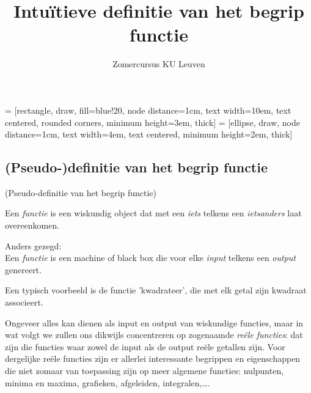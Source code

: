 \documentclass{ximera}
\author{Zomercursus KU Leuven}
\title{Intuïtieve definitie van het begrip functie}
\begin{document}
\begin{abstract}

\end{abstract}
\maketitle  

 = [rectangle, draw, fill=blue!20, node distance=1cm, text width=10em, text centered, rounded corners, minimum height=3em, thick]
 = [ellipse, draw, node distance=1cm, text width=4em, text centered, minimum height=2em, thick]

\subsection{(Pseudo-)definitie van het begrip functie}

\begin{definition} (Pseudo-definitie van het begrip functie)\label{fctie:def:pseudodef}
    
Een  \textit{functie} is een wiskundig object dat met een \textit{iets} telkens een \textit{ietsanders} laat overeenkomen. 


Anders gezegd: \\
Een \textit{functie} is een machine of black box die voor elke \textit{input} telkens een \textit{output} genereert.
\end{definition}

Een typisch voorbeeld is de functie 'kwadrateer', die met elk getal zijn kwadraat associeert.


Ongeveer alles kan dienen als input en output van wiskundige functies, maar in wat volgt we zullen ons dikwijls concentreren op zogenaamde \textit{reële functies}: dat zijn die functies waar zowel de input als de output reële getallen zijn. Voor dergelijke reële functies zijn er allerlei interessante begrippen en eigenschappen die niet zomaar van toepassing zijn op meer algemene functies: nulpunten, minima en maxima, grafieken, afgeleiden, integralen,\ldots.

\begin{center}
\end{center}
\end{document}
